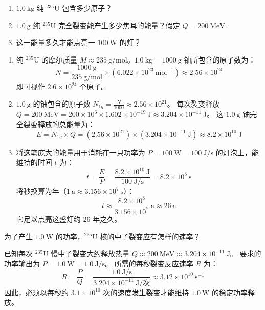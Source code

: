 \begin{exercise}\label{ex:29.29}
\begin{enumerate}
  \item[(a)] $1.0 \ \mathrm{kg}$ 纯 $^{235}\mathrm{U}$ 包含多少原子？
  \item[(b)] $1.0 \ \mathrm{g}$ 纯 $^{235}\mathrm{U}$ 完全裂变能产生多少焦耳的能量？假定 $Q = 200 \ \mathrm{MeV}$. 
  \item[(c)] 这一能量多久才能点亮一 $100 \ \mathrm{W}$ 的灯？
\end{enumerate}
\end{exercise}
\begin{solution}
\begin{enumerate}
    \item[(a)] 纯 $^{235}\mathrm{U}$ 的摩尔质量 $M \approx 235 \ \mathrm{g/mol}$。$1.0 \ \mathrm{kg} = 1000 \ \mathrm{g}$ 铀所包含的原子数为：
    $$ N = \frac{1000 \ \mathrm{g}}{235 \ \mathrm{g/mol}} \times (6.022 \times 10^{23} \ \mathrm{mol^{-1}}) \approx 2.56 \times 10^{24} $$
    即可视作 $2.6 \times 10^{24}$ 个原子。

    \item[(b)] $1.0 \ \mathrm{g}$ 的铀包含的原子数 $N_{1g} = \frac{N}{1000} \approx 2.56 \times 10^{21}$。
    每次裂变释放 $Q = 200 \ \mathrm{MeV} = 200 \times 10^6 \times 1.602 \times 10^{-19} \ \mathrm{J} \approx 3.204 \times 10^{-11} \ \mathrm{J}$。
    这 $1.0 \ \mathrm{g}$ 铀完全裂变释放的总能量为：
    $$ E = N_{1g} \times Q = (2.56 \times 10^{21}) \times (3.204 \times 10^{-11} \ \mathrm{J}) \approx 8.2 \times 10^{10} \ \mathrm{J} $$
    
    \item[(c)] 将这笔庞大的能量用于消耗在一只功率为 $P = 100 \ \mathrm{W} = 100 \ \mathrm{J/s}$ 的灯泡上，能维持的时间 $t$ 为：
    $$ t = \frac{E}{P} = \frac{8.2 \times 10^{10} \ \mathrm{J}}{100 \ \mathrm{J/s}} = 8.2 \times 10^8 \ \mathrm{s} $$
    将秒换算为年（$1 \ \mathrm{a} \approx 3.156 \times 10^7 \ \mathrm{s}$）：
    $$ t \approx \frac{8.2 \times 10^8}{3.156 \times 10^7} \ \mathrm{a} \approx 26 \ \mathrm{a} $$
    它足以点亮这盏灯约 $26$ 年之久。
\end{enumerate}
\end{solution}

\begin{exercise}\label{ex:29.30}
为了产生 $1.0 \ \mathrm{W}$ 的功率，$^{235}\mathrm{U}$ 核的中子裂变应有怎样的速率？
\end{exercise}
\begin{solution}
已知每次 $^{235}\mathrm{U}$ 慢中子裂变大约释放热量 $Q \approx 200 \ \mathrm{MeV} \approx 3.204 \times 10^{-11} \ \mathrm{J}$。
要求的功率输出为 $P = 1.0 \ \mathrm{W} = 1.0 \ \mathrm{J/s}$。
所需的每秒裂变反应速率 $R$ 为：
$$ R = \frac{P}{Q} = \frac{1.0 \ \mathrm{J/s}}{3.204 \times 10^{-11} \ \mathrm{J}/\text{次}} \approx 3.12 \times 10^{10} \ \mathrm{s^{-1}} $$
因此，必须以每秒约 $3.1 \times 10^{10}$ 次的速度发生裂变才能维持 $1.0 \ \mathrm{W}$ 的稳定功率释放。
\end{solution}


